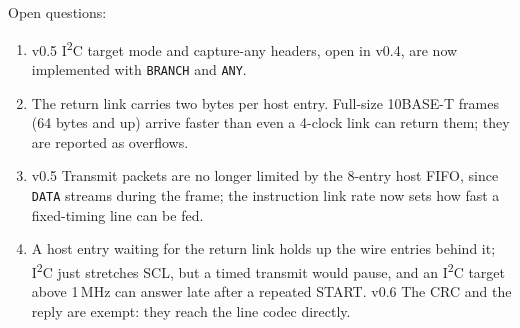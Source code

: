 \documentclass[11pt,a4paper]{article}
\newcommand{\vfive}{\textcolor{fivec}{\textsf{\small v0.5}}}
\newcommand{\vsix}{\textcolor{sixc}{\textsf{\small v0.6}}}
\newcommand{\sig}[1]{\texttt{#1}}
\begin{document}
Open questions:
\begin{enumerate}
\item \vfive{} I\textsuperscript{2}C target mode and capture-any headers, open in v0.4, are now implemented with \sig{BRANCH} and \sig{ANY}.
\item The return link carries two bytes per host entry. Full-size 10BASE-T frames (64 bytes and up) arrive faster than even a 4-clock link can return them; they are reported as overflows.
\item \vfive{} Transmit packets are no longer limited by the 8-entry host FIFO, since \sig{DATA} streams during the frame; the instruction link rate now sets how fast a fixed-timing line can be fed.
\item A host entry waiting for the return link holds up the wire entries behind it; I\textsuperscript{2}C just stretches SCL, but a timed transmit would pause, and an I\textsuperscript{2}C target above 1\,MHz can answer late after a repeated START. \vsix{} The CRC and the reply are exempt: they reach the line codec directly.
\end{enumerate}
\end{document}
